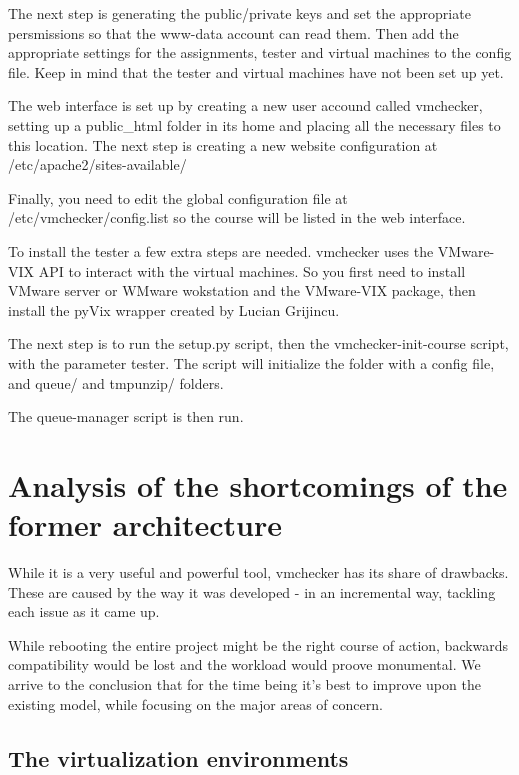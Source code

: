 The next step is generating the public/private keys and set the appropriate 
persmissions so that the www-data account can read them. Then add the appropriate 
settings for the assignments, tester and virtual machines to the config file.
Keep in mind that the tester and virtual machines have not been set up yet.

The web interface is set up by creating a new user accound called vmchecker,
setting up a public_html folder in its home and placing all the necessary files
to this location. The next step is creating a new website configuration at 
/etc/apache2/sites-available/

Finally, you need to edit the global configuration file at /etc/vmchecker/config.list
so the course will be listed in the web interface.

To install the tester a few extra steps are needed. vmchecker uses the VMware-VIX
API to interact with the virtual machines. So you first need to install VMware
server or WMware wokstation and the VMware-VIX package, then install the pyVix 
wrapper created by Lucian Grijincu.

The next step is to run the setup.py script, then the vmchecker-init-course script,
with the parameter tester. The script will initialize the folder with a config file,
and queue/ and tmpunzip/ folders.

The queue-manager script is then run. 


\section{Analysis of the shortcomings of the former architecture}
\label{sec:vmc-analysis}

While it is a very useful and powerful tool, vmchecker has its share of drawbacks.
These are caused by the way it was developed - in an incremental way, tackling 
each issue as it came up. 

While rebooting the entire project might be the right course of action, 
backwards compatibility would be lost and the workload would 
proove monumental. We arrive to the conclusion that for the time being it's best
to improve upon the existing model, while focusing on the major areas of concern.

\subsection{The virtualization environments}
\label{sub-sec:vmc-analysis-env}

